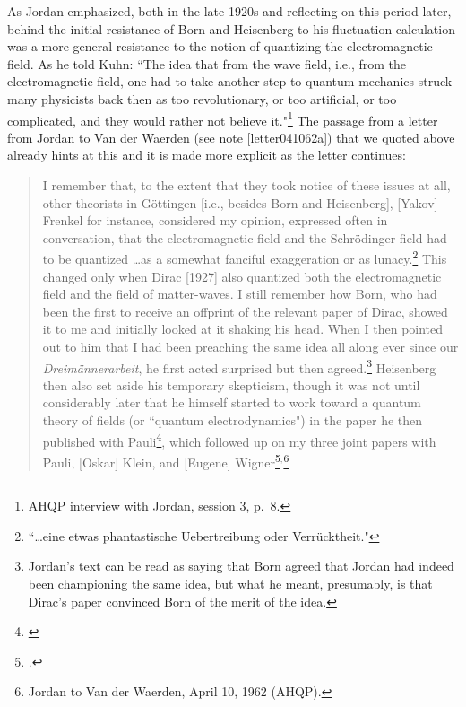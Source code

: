 \documentclass[12pt]{elsart}
\begin{document}
As Jordan emphasized, both in the late 1920s and reflecting on this period later, behind the initial resistance of Born and Heisenberg to his fluctuation calculation was a more general resistance to the notion of quantizing the electromagnetic field. As he told Kuhn: ``The idea that from the wave field, i.e., from the electromagnetic field, one had to take another step to quantum mechanics struck many physicists back then as too revolutionary, or too artificial, or too complicated, and they would rather not believe it."\footnote{AHQP interview with Jordan, session 3, p.\ 8.} The passage from a letter from Jordan to Van der Waerden (see note \ref{letter041062a}) that we quoted above already hints at this and it is made more explicit as the letter continues:
\begin{quotation}
I remember that, to the extent that they took notice of these issues at all, other theorists in G\"ottingen [i.e., besides Born and Heisenberg], [Yakov] Frenkel for instance,  considered my opinion, expressed often in conversation, that the electromagnetic field and the Schr\"odinger field had to be quantized \ldots  as a somewhat fanciful exaggeration or as lunacy.\footnote{``\ldots eine etwas phantasti\-sche Uebertreibung oder Verr\"ucktheit."} This changed only when Dirac [1927] also quantized both the electromagnetic field and the field of matter-waves. I still remember how Born, who had been the first to receive an offprint of the relevant paper of Dirac, showed it to me and initially looked at it shaking his head. When I then pointed out to him that I had been preaching the same idea all along ever since our {\it Dreim\"annerarbeit}, he first acted surprised but then agreed.\footnote{Jordan's text can be read as saying that Born agreed that Jordan had indeed been championing the same idea, but what he meant, presumably, is that Dirac's paper convinced Born of the merit of the idea.} Heisenberg then also set aside his temporary skepticism, though it was not until considerably later that he himself started to work toward a quantum theory of fields (or ``quantum electrodynamics") in the paper he then published with Pauli\footnote{\citep{Heisenberg and Pauli 1929, Heisenberg and Pauli 1930}}, which followed up on my three joint papers with Pauli, [Oskar] Klein, and [Eugene] Wigner\footnote{\citep{Jordan and Pauli 1928, Jordan and Klein 1927, Jordan and Wigner 1928}. }$^,$\footnote{Jordan to Van der Waerden, April 10, 1962 (AHQP).} 
\end{quotation}
\end{document}
